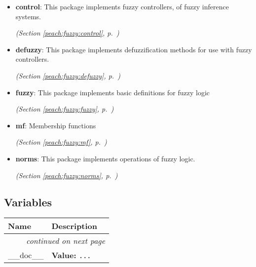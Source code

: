 \begin{itemize}
\setlength{\parskip}{0ex}
\item \textbf{control}: 
This package implements fuzzy controllers, of fuzzy inference systems.


  \textit{(Section \ref{peach:fuzzy:control}, p.~\pageref{peach:fuzzy:control})}

\item \textbf{defuzzy}: 
This package implements defuzzification methods for use with fuzzy controllers.


  \textit{(Section \ref{peach:fuzzy:defuzzy}, p.~\pageref{peach:fuzzy:defuzzy})}

\item \textbf{fuzzy}: 
This package implements basic definitions for fuzzy logic


  \textit{(Section \ref{peach:fuzzy:fuzzy}, p.~\pageref{peach:fuzzy:fuzzy})}

\item \textbf{mf}: 
Membership functions


  \textit{(Section \ref{peach:fuzzy:mf}, p.~\pageref{peach:fuzzy:mf})}

\item \textbf{norms}: 
This package implements operations of fuzzy logic.


  \textit{(Section \ref{peach:fuzzy:norms}, p.~\pageref{peach:fuzzy:norms})}

\end{itemize}



  \subsection{Variables}

\begin{longtable}{|p{}|p{}|l}
\cline{1-2}
\cline{1-2} \centering \textbf{Name} & \centering \textbf{Description}& \\
\cline{1-2}
\endhead\cline{1-2}\multicolumn{3}{r}{\small\textit{continued on next page}}\\\endfoot\cline{1-2}
\endlastfoot\raggedright \_\-\_\-d\-o\-c\-\_\-\_\- & \raggedright \textbf{Value:} 
{\tt \texttt{...}}&\\
\cline{1-2}
\end{longtable}

